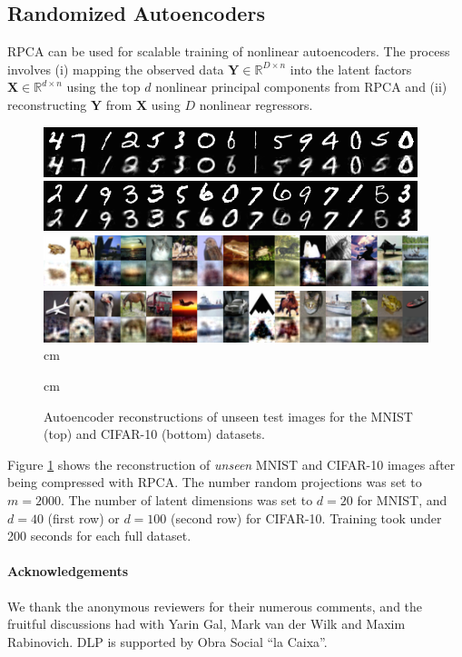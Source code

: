 \documentclass{article}
\begin{document}
  \subsection{Randomized Autoencoders}\label{sec:autoencoders}
  RPCA can be used for scalable training of nonlinear autoencoders. The process
  involves (i) mapping the observed data $\bm Y\in\mathbb{R}^{D\times n}$ into
  the latent factors $\bm X \in\mathbb{R}^{d\times n}$ using the top $d$
  nonlinear principal components from RPCA and (ii) reconstructing $\bm
  Y$ from $\bm X$ using $D$ nonlinear regressors.
  
  \begin{figure}[h!]
    \begin{center}
    \includegraphics[width=\linewidth]{figures/ae1.png}\\
    \includegraphics[width=\linewidth]{figures/ae2.png}\\
    \includegraphics[width=\linewidth]{figures/ae4.png}\\
    \includegraphics[width=\linewidth]{figures/ae5.png}
     cm
    \end{center}
     cm
    \caption{Autoencoder reconstructions of unseen test images for the MNIST (top) and
    CIFAR-10 (bottom) datasets.} 
    \label{fig:autoencoder}
  \end{figure}

  Figure \ref{fig:autoencoder} shows the reconstruction of \emph{unseen} MNIST
  and CIFAR-10 images after being compressed with RPCA.
  The number random projections was set to $m=2000$. The number of latent
  dimensions was set to $d=20$ for MNIST, and $d=40$ (first row) or $d=100$
  (second row) for CIFAR-10.
  Training took under 200 seconds for each full dataset.

  \paragraph{Acknowledgements}
  We thank the anonymous reviewers for their numerous comments, and the
  fruitful discussions had with Yarin Gal, Mark van der Wilk and Maxim
  Rabinovich. DLP is supported by Obra Social ``la Caixa''. 

  \clearpage
  \newpage
  
  
\end{document}
